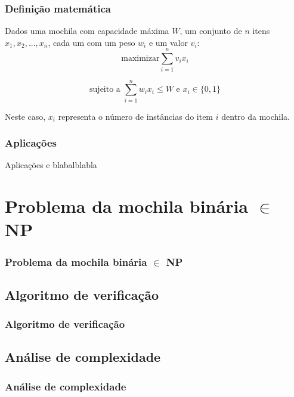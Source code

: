 \documentclass{beamer}
\begin{document}
\begin{frame}
\frametitle{Definição matemática}

    Dados uma mochila com capacidade máxima $W$, um conjunto de $n$ itens $x_{1}, x_{2}, ..., x_{n}$,
    cada um com um peso $w_{i}$ e um valor $v_{i}$:\\

    \begin{equation*}
        \text{maximizar} \sum_{i=1}^{n} v_{i} x_{i}
    \end{equation*}

    \begin{equation*}
        \mbox{sujeito a } \sum_{i=1}^{n} w_{i} x_{i} \leq W \mbox{ e } x_{i} \in \{0,1\}
    \end{equation*}

    Neste caso, $x_{i}$ representa o número de instâncias do item $i$ dentro da mochila.

\end{frame}

\begin{frame}
\frametitle{Aplicações}

Aplicações e blabalblabla

\end{frame}


\section{Problema da mochila binária $\in$ NP}
\begin{frame}
\frametitle{Problema da mochila binária $\in$ NP}
\end{frame}

\subsection{Algoritmo de verificação}
\begin{frame}
\frametitle{Algoritmo de verificação}
\end{frame}

\subsection{Análise de complexidade}
\begin{frame}
\frametitle{Análise de complexidade}
\end{frame}
\end{document}
